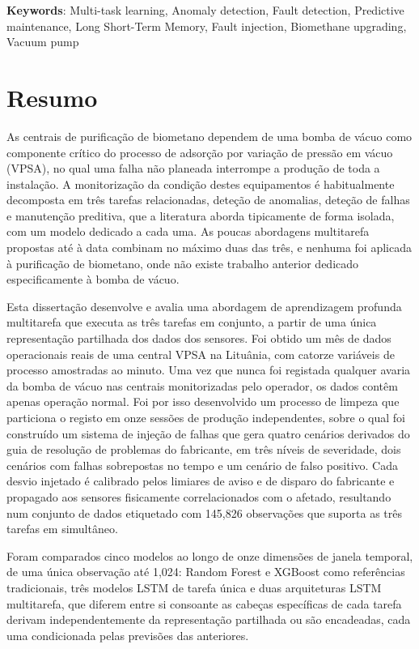 \vspace*{10mm}\noindent
\textbf{Keywords}: Multi-task learning, Anomaly detection, Fault detection, Predictive maintenance,
Long Short-Term Memory, Fault injection, Biomethane upgrading, Vacuum pump

\chapter*{Resumo}

As centrais de purificação de biometano dependem de uma bomba de vácuo como componente crítico do processo
de adsorção por variação de pressão em vácuo (VPSA), no qual uma falha não planeada interrompe a produção
de toda a instalação. A monitorização da condição destes equipamentos é habitualmente decomposta em três
tarefas relacionadas, deteção de anomalias, deteção de falhas e manutenção preditiva, que a literatura
aborda tipicamente de forma isolada, com um modelo dedicado a cada uma. As poucas abordagens multitarefa
propostas até à data combinam no máximo duas das três, e nenhuma foi aplicada à purificação de biometano,
onde não existe trabalho anterior dedicado especificamente à bomba de vácuo.

Esta dissertação desenvolve e avalia uma abordagem de aprendizagem profunda multitarefa que executa as três
tarefas em conjunto, a partir de uma única representação partilhada dos dados dos sensores. Foi obtido um
mês de dados operacionais reais de uma central VPSA na Lituânia, com catorze variáveis de processo
amostradas ao minuto. Uma vez que nunca foi registada qualquer avaria da bomba de vácuo nas centrais
monitorizadas pelo operador, os dados contêm apenas operação normal. Foi por isso desenvolvido um processo
de limpeza que particiona o registo em onze sessões de produção independentes, sobre o qual foi construído
um sistema de injeção de falhas que gera quatro cenários derivados do guia de resolução de problemas do
fabricante, em três níveis de severidade, dois cenários com falhas sobrepostas no tempo e um cenário de
falso positivo. Cada desvio injetado é calibrado pelos limiares de aviso e de disparo do fabricante e
propagado aos sensores fisicamente correlacionados com o afetado, resultando num conjunto de dados
etiquetado com 145{,}826 observações que suporta as três tarefas em simultâneo.

Foram comparados cinco modelos ao longo de onze dimensões de janela temporal, de uma única observação até
1{,}024: Random Forest e XGBoost como referências tradicionais, três modelos LSTM de tarefa única e duas
arquiteturas LSTM multitarefa, que diferem entre si consoante as cabeças específicas de cada tarefa derivam
independentemente da representação partilhada ou são encadeadas, cada uma condicionada pelas previsões das
anteriores.

